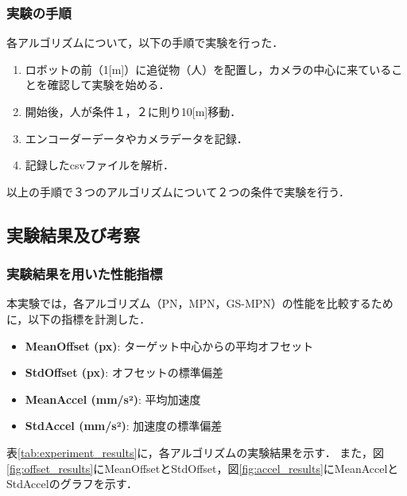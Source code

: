 \subsubsection{実験の手順}
各アルゴリズムについて，以下の手順で実験を行った．
\begin{enumerate}
    \item ロボットの前（1[m]）に追従物（人）を配置し，カメラの中心に来ていることを確認して実験を始める．
    \item 開始後，人が条件１，２に則り10[m]移動．
    \item エンコーダーデータやカメラデータを記録．
    \item 記録したcsvファイルを解析．
\end{enumerate}
以上の手順で３つのアルゴリズムについて２つの条件で実験を行う．

\subsection{実験結果及び考察}
\subsubsection{実験結果を用いた性能指標}
本実験では，各アルゴリズム（PN，MPN，GS-MPN）の性能を比較するために，以下の指標を計測した．
\begin{itemize}
    \item \textbf{MeanOffset (px)}: ターゲット中心からの平均オフセット
    \item \textbf{StdOffset (px)}: オフセットの標準偏差
    \item \textbf{MeanAccel (mm/s²)}: 平均加速度
    \item \textbf{StdAccel (mm/s²)}: 加速度の標準偏差
\end{itemize}

表\ref{tab:experiment_results}に，各アルゴリズムの実験結果を示す．
また，図\ref{fig:offset_results}にMeanOffsetとStdOffset，図\ref{fig:accel_results}にMeanAccelとStdAccelのグラフを示す．

